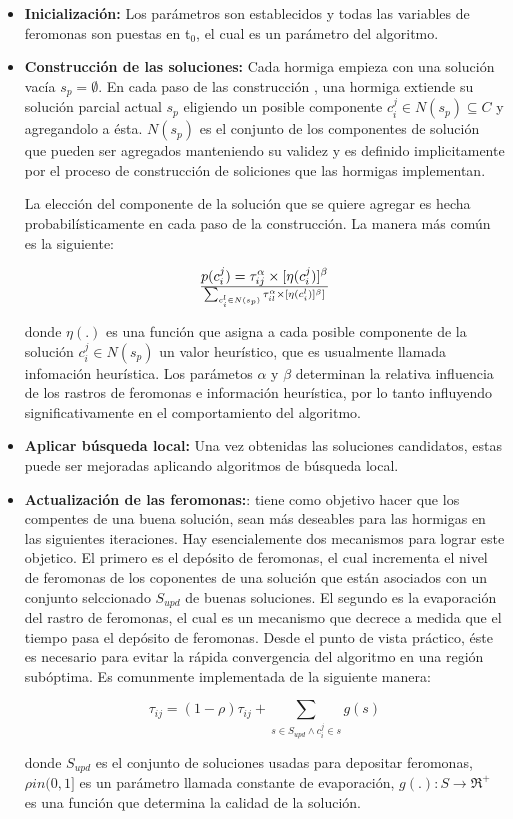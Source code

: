 \begin{itemize}

\item {\bf Inicializaci\'on:} Los par\'ametros son establecidos y todas las variables 
de feromonas son puestas en t$_{0}$, el cual es un par\'ametro del algoritmo.

\item {\bf Construcci\'on de las soluciones:} Cada hormiga empieza con una soluci\'on vac\'ia
$s_p = \emptyset $. En cada paso de las construcci\'on , una hormiga
extiende su soluci\'on parcial actual $s_p$ eligiendo un posible componente $c_i^j \in N(s_p) \subseteq C$ 
y agregandolo a \'esta. $N(s_p)$ es el conjunto de los
componentes de soluci\'on que pueden ser agregados manteniendo su validez
y es definido implicitamente por el proceso de construcci\'on de soliciones
que las hormigas implementan. 

La elecci\'on del componente de la soluci\'on que se quiere agregar es 
hecha probabil\'isticamente en cada paso de la construcci\'on. La manera m\'as
com\'un es la siguiente:

\[
p(c_i^j) = {\tau_{ij}^{\alpha}  \times [ \eta (c_i^j) ]^{\beta}}  \over { \sum_{c_i^l \in N(s_p)} \tau_{il}^{\alpha} \times [\eta (c_i^l)]^{\beta}] } 
\]

donde $\eta(.)$ es una funci\'on  que asigna a cada posible componente 
de la soluci\'on $c_i^j \in N(s_p)$ un valor heur\'istico, que es usualmente
llamada infomaci\'on heur\'istica. Los par\'ametos $\alpha$ y $\beta$ 
determinan la relativa influencia de los rastros de feromonas e informaci\'on
heur\'istica, por lo tanto influyendo significativamente en el comportamiento
del algoritmo.


\item {\bf Aplicar b\'usqueda local:} Una vez obtenidas las soluciones candidatos,
estas puede ser mejoradas aplicando algoritmos de b\'usqueda local.

\item {\bf Actualizaci\'on de las feromonas:}: tiene como objetivo
hacer que los compentes de una buena soluci\'on, 
sean m\'as deseables para las hormigas en las siguientes iteraciones. Hay esencialemente
dos mecanismos para lograr este objetico. El primero es el dep\'osito de feromonas,
el cual incrementa el nivel de feromonas de los coponentes de una soluci\'on
que est\'an asociados con un conjunto selccionado $S_{upd}$ de buenas soluciones.
El segundo es la evaporaci\'on del rastro de feromonas, el cual es un mecanismo
que decrece a medida que el tiempo pasa el dep\'osito de feromonas. Desde el punto de
vista pr\'actico, \'este es necesario para evitar la r\'apida convergencia del algoritmo
en una regi\'on sub\'optima. Es comunmente implementada de la siguiente
manera:

\[
\tau_{ij} = (1-\rho)\tau_{ij} + \sum_{s \in S_{upd} \land c_i^j \in s} g(s)
\]

donde $S_{upd}$ es el conjunto de soluciones usadas para depositar feromonas, 
$\rho in (0,1]$ es un par\'ametro llamada constante de evaporaci\'on,
$g(.):S \rightarrow  \Re^+$ es una funci\'on que determina la calidad
de la soluci\'on.
\end{itemize}

